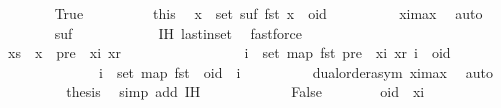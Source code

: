 \begin{isabellebody}
\ \ \ \ \ \ \isamarkupfalse%
\ True\isanewline
\ \ \ \ \ \ \isamarkupfalse%
\ \isamarkupfalse%
\ this\ \isamarkupfalse%
\ {\isachardoublequoteopen}{\isasymforall}x\ {\isasymin}\ set\ suf{\isachardot}\ fst\ x\ {\isacharless}\ oid{\isachardoublequoteclose}\isanewline
\ \ \ \ \ \ \ \ \isamarkupfalse%
\ xi{\isacharunderscore}max\ \isamarkupfalse%
\ auto\isanewline
\ \ \ \ \ \ \isamarkupfalse%
\ {\isachardoublequoteopen}suf\ {\isacharequal}\ {\isacharbrackleft}{\isacharbrackright}{\isachardoublequoteclose}\isanewline
\ \ \ \ \ \ \ \ \isamarkupfalse%
\ IH\ last{\isacharunderscore}in{\isacharunderscore}set\ \isamarkupfalse%
\ fastforce\isanewline
\ \ \ \ \ \ \isamarkupfalse%
\ \isamarkupfalse%
\ {\isachardoublequoteopen}xs\ {\isacharat}\ {\isacharbrackleft}x{\isacharbrackright}\ {\isacharequal}\ {\isacharparenleft}pre\ {\isacharat}\ {\isacharbrackleft}{\isacharparenleft}xi{\isacharcomma}\ xr{\isacharparenright}{\isacharbrackright}{\isacharparenright}\ {\isacharat}\ {\isacharbrackleft}{\isacharbrackright}\ {\isasymand}\isanewline
\ \ \ \ \ \ \ \ \ \ \ \ \ \ {\isacharparenleft}{\isasymforall}i\ {\isasymin}\ set\ {\isacharparenleft}map\ fst\ {\isacharparenleft}{\isacharparenleft}pre\ {\isacharat}\ {\isacharbrackleft}{\isacharparenleft}xi{\isacharcomma}\ xr{\isacharparenright}{\isacharbrackright}{\isacharparenright}{\isacharparenright}{\isacharparenright}{\isachardot}\ i\ {\isacharless}\ oid{\isacharparenright}\ {\isasymand}\isanewline
\ \ \ \ \ \ \ \ \ \ \ \ \ \ {\isacharparenleft}{\isasymforall}i\ {\isasymin}\ set\ {\isacharparenleft}map\ fst\ {\isacharbrackleft}{\isacharbrackright}{\isacharparenright}{\isachardot}\ oid\ {\isacharless}\ i{\isacharparenright}{\isachardoublequoteclose}\isanewline
\ \ \ \ \ \ \ \ \isamarkupfalse%
\ dual{\isacharunderscore}order{\isachardot}asym\ xi{\isacharunderscore}max\ \isamarkupfalse%
\ auto\isanewline
\ \ \ \ \ \ \isamarkupfalse%
\ \isamarkupfalse%
\ {\isacharquery}thesis\ \isamarkupfalse%
\ {\isacharparenleft}simp\ add{\isacharcolon}\ IH{\isacharparenright}\isanewline
\ \ \ \ \isamarkupfalse%
\isanewline
\ \ \ \ \ \ \isamarkupfalse%
\ False\isanewline
\ \ \ \ \ \ \isamarkupfalse%
\ {\isachardoublequoteopen}oid\ {\isacharless}\ xi{\isachardoublequoteclose}\isanewline
\ \ \ \ \ \ \ \ \isamarkupfalse%

\end{isabellebody}
